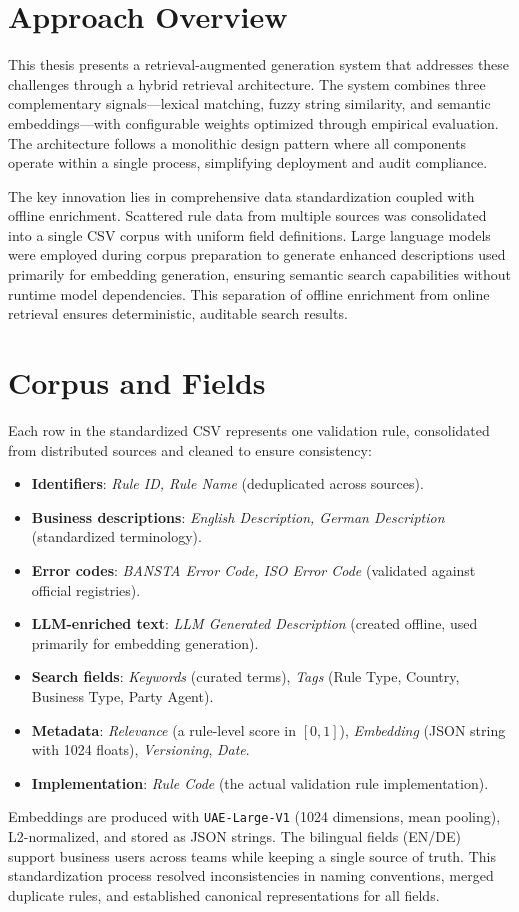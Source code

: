 \section{Approach Overview}
This thesis presents a retrieval-augmented generation system that addresses these challenges through a hybrid retrieval architecture. The system combines three complementary signals—lexical matching, fuzzy string similarity, and semantic embeddings—with configurable weights optimized through empirical evaluation. The architecture follows a monolithic design pattern where all components operate within a single process, simplifying deployment and audit compliance.

The key innovation lies in comprehensive data standardization coupled with offline enrichment. Scattered rule data from multiple sources was consolidated into a single CSV corpus with uniform field definitions. Large language models were employed during corpus preparation to generate enhanced descriptions used primarily for embedding generation, ensuring semantic search capabilities without runtime model dependencies. This separation of offline enrichment from online retrieval ensures deterministic, auditable search results.

\section{Corpus and Fields}
Each row in the standardized CSV represents one validation rule, consolidated from distributed sources and cleaned to ensure consistency:
\begin{itemize}[leftmargin=*,itemsep=2pt,topsep=2pt]
 \item \textbf{Identifiers}: \textit{Rule ID, Rule Name} (deduplicated across sources).
 \item \textbf{Business descriptions}: \textit{English Description, German Description} (standardized terminology).
 \item \textbf{Error codes}: \textit{BANSTA Error Code, ISO Error Code} (validated against official registries).
 \item \textbf{LLM-enriched text}: \textit{LLM Generated Description} (created offline, used primarily for embedding generation).
 \item \textbf{Search fields}: \textit{Keywords} (curated terms), \textit{Tags} (Rule Type, Country, Business Type, Party Agent).
 \item \textbf{Metadata}: \textit{Relevance} (a rule-level score in $[0,1]$), \textit{Embedding} (JSON string with 1024 floats), \textit{Versioning}, \textit{Date}.
 \item \textbf{Implementation}: \textit{Rule Code} (the actual validation rule implementation).
\end{itemize}
Embeddings are produced with \texttt{UAE-Large-V1} \cite{uae2023large} (1024 dimensions, mean pooling), L2-normalized, and stored as JSON strings. The bilingual fields (EN/DE) support business users across teams while keeping a single source of truth. This standardization process resolved inconsistencies in naming conventions, merged duplicate rules, and established canonical representations for all fields.

